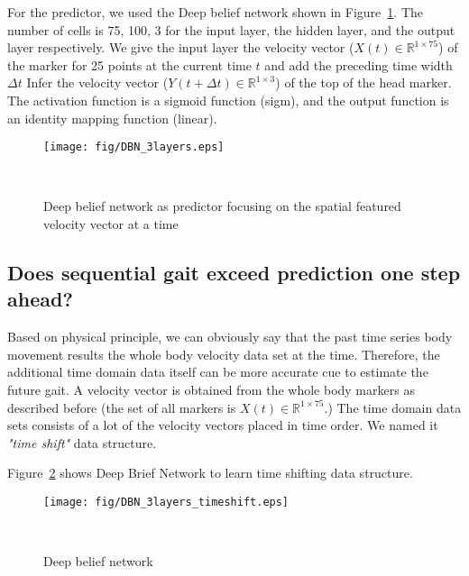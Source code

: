 \documentclass{sigchi}
\begin{document}
For the predictor, we used the Deep belief network shown in Figure~\ref{fig:dbn}. The number of cells is 75, 100, 3 for the input layer, the hidden layer, and the output layer respectively. We give the input layer the velocity vector ($ X (t) \in \mathbb {R}^{1 \times 75} $) of the marker for 25 points at the current time $ t $ and add the preceding time width $ \Delta t $ Infer the velocity vector ($ Y (t + \Delta t) \in \mathbb {R} ^{1 \times 3} $) of the top of the head marker. The activation function is a sigmoid function (sigm), and the output function is an identity mapping function (linear).

\begin{figure}
\centering
\hspace{10mm}\texttt{[image: fig/DBN\_3layers.eps]}\vspace{3mm}
  \caption{Deep belief network as predictor focusing on the spatial featured velocity vector at a time}~\label{fig:dbn}
\end{figure}

\subsection{Does sequential gait exceed prediction one step ahead?}

Based on physical principle, we can obviously say that the past time series body movement results the whole body velocity data set at the time. Therefore, the additional time domain data itself can be more accurate cue to estimate the future gait. A velocity vector is obtained from the whole body markers as described before (the set of all markers is $X(t)\in\mathbb{R}^{1 \times 75} $.) The time domain data sets consists of a lot of the velocity vectors placed in time order. We named it \textit{ "time shift"} data structure. 

Figure~\ref{fig:dbn_timeshift} shows Deep Brief Network to learn time shifting data structure.


\begin{figure}
\centering
  \texttt{[image: fig/DBN\_3layers\_timeshift.eps]}
  \caption{Deep belief network}~\label{fig:dbn_timeshift}
\end{figure}
\end{document}
